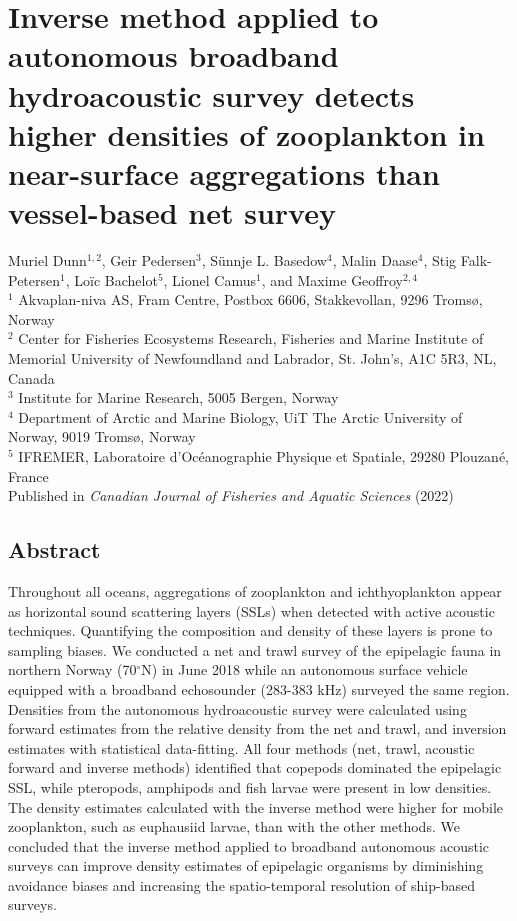 \chapter{Inverse method applied to autonomous broadband hydroacoustic survey detects higher densities of zooplankton in near-surface aggregations than vessel-based net survey}
\label{chap:invtab}



Muriel Dunn$^{1,2}$, Geir Pedersen$^3$, S\"{u}nnje L. Basedow$^4$, Malin Daase$^4$, Stig Falk-Petersen$^1$, Lo\"{i}c Bachelot$^5$, Lionel Camus$^1$, and Maxime Geoffroy$^{2,4}$\\

$^1$ Akvaplan-niva AS, Fram Centre, Postbox 6606, Stakkevollan, 9296 Tromsø, Norway \\
$^2$ Center for Fisheries Ecosystems Research, Fisheries and Marine Institute of Memorial University of Newfoundland and Labrador, St. John's, A1C 5R3, NL, Canada\\
$^3$ Institute for Marine Research, 5005 Bergen, Norway\\
$^4$ Department of Arctic and Marine Biology, UiT The Arctic University of Norway, 9019 Tromsø, Norway\\
$^5$ IFREMER, Laboratoire d’Océanographie Physique et Spatiale, 29280 Plouzané, France\\

Published in \textit{Canadian Journal of Fisheries and Aquatic Sciences} (2022)\\

\section{Abstract}
Throughout all oceans, aggregations of zooplankton and ichthyoplankton appear as horizontal sound scattering layers (SSLs) when detected with active acoustic techniques. Quantifying the composition and density of these layers is prone to sampling biases. We conducted a net and trawl survey of the epipelagic fauna in northern Norway (70$^{\circ}$N) in June 2018 while an autonomous surface vehicle equipped with a broadband echosounder (283-383 kHz) surveyed the same region. Densities from the autonomous hydroacoustic survey were calculated using forward estimates from the relative density from the net and trawl, and inversion estimates with statistical data-fitting. All four methods (net, trawl, acoustic forward and inverse methods) identified that copepods dominated the epipelagic SSL, while pteropods, amphipods and fish larvae were present in low densities. The density estimates calculated with the inverse method were higher for mobile zooplankton, such as euphausiid larvae, than with the other methods. We concluded that the inverse method applied to broadband autonomous acoustic surveys can improve density estimates of epipelagic organisms by diminishing avoidance biases and increasing the spatio-temporal resolution of ship-based surveys.

